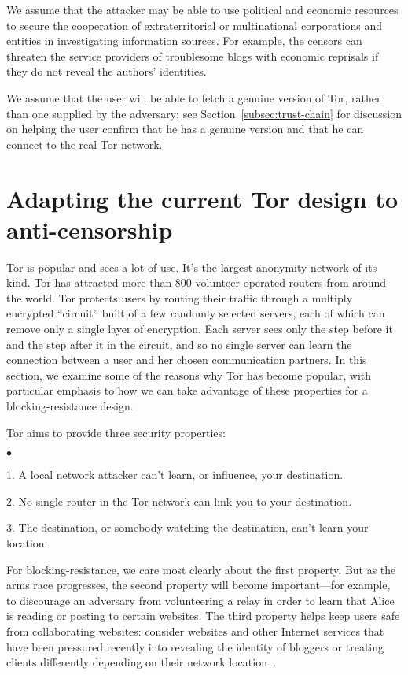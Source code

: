 \documentclass{llncs}
\newenvironment{tightlist}{\begin{list}{$\bullet$}{
  \setlength{\itemsep}{0mm}
    \setlength{\parsep}{0mm}
    }}{\end{list}}
\begin{document}
We assume that the attacker may be able to use political and economic
resources to secure the cooperation of extraterritorial or multinational
corporations and entities in investigating information sources.  For example,
the censors can threaten the service providers of troublesome blogs
with economic
reprisals if they do not reveal the authors' identities.

We assume that the user will be able to fetch a genuine
version of Tor, rather than one supplied by the adversary; see
Section~\ref{subsec:trust-chain} for discussion on helping the user
confirm that he has a genuine version and that he can connect to the
real Tor network.

\section{Adapting the current Tor design to anti-censorship}
\label{sec:current-tor}

Tor is popular and sees a lot of use. It's the largest anonymity
network of its kind.
Tor has attracted more than 800 volunteer-operated routers from around the
world.  Tor protects users by routing their traffic through a multiply
encrypted ``circuit'' built of a few randomly selected servers, each of which
can remove only a single layer of encryption.  Each server sees only the step
before it and the step after it in the circuit, and so no single server can
learn the connection between a user and her chosen communication partners.
In this section, we examine some of the reasons why Tor has become popular,
with particular emphasis to how we can take advantage of these properties
for a blocking-resistance design.

Tor aims to provide three security properties:
\begin{tightlist}
\item 1. A local network attacker can't learn, or influence, your
destination.
\item 2. No single router in the Tor network can link you to your
destination.
\item 3. The destination, or somebody watching the destination,
can't learn your location.
\end{tightlist}

For blocking-resistance, we care most clearly about the first
property. But as the arms race progresses, the second property
will become important---for example, to discourage an adversary
from volunteering a relay in order to learn that Alice is reading
or posting to certain websites. The third property helps keep users safe from
collaborating websites: consider websites and other Internet services 
that have been pressured
recently into revealing the identity of bloggers
or treating clients differently depending on their network
location~\cite{goodell-syverson06}.
\end{document}
